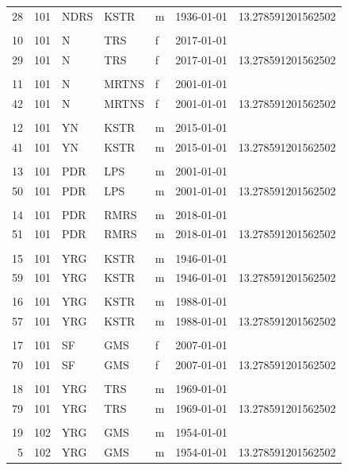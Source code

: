 \documentclass[
  12pt,
]{book}
\begin{document}
\begin{table}[t]
\begin{tabular*}{1\linewidth}{@{\extracolsep{\fill}}rrlllrr}
28 & 101 & NDRS & KSTR & m & 1936-01-01 & 13.278591201562502 \\ 
 &  &  &  &  &  &  \\ 
10 & 101 & N & TRS & f & 2017-01-01 &  \\ 
29 & 101 & N & TRS & f & 2017-01-01 & 13.278591201562502 \\ 
 &  &  &  &  &  &  \\ 
11 & 101 & N & MRTNS & f & 2001-01-01 &  \\ 
42 & 101 & N & MRTNS & f & 2001-01-01 & 13.278591201562502 \\ 
 &  &  &  &  &  &  \\ 
12 & 101 & YN & KSTR & m & 2015-01-01 &  \\ 
41 & 101 & YN & KSTR & m & 2015-01-01 & 13.278591201562502 \\ 
 &  &  &  &  &  &  \\ 
13 & 101 & PDR & LPS & m & 2001-01-01 &  \\ 
50 & 101 & PDR & LPS & m & 2001-01-01 & 13.278591201562502 \\ 
 &  &  &  &  &  &  \\ 
14 & 101 & PDR & RMRS & m & 2018-01-01 &  \\ 
51 & 101 & PDR & RMRS & m & 2018-01-01 & 13.278591201562502 \\ 
 &  &  &  &  &  &  \\ 
15 & 101 & YRG & KSTR & m & 1946-01-01 &  \\ 
59 & 101 & YRG & KSTR & m & 1946-01-01 & 13.278591201562502 \\ 
 &  &  &  &  &  &  \\ 
16 & 101 & YRG & KSTR & m & 1988-01-01 &  \\ 
57 & 101 & YRG & KSTR & m & 1988-01-01 & 13.278591201562502 \\ 
 &  &  &  &  &  &  \\ 
17 & 101 & SF & GMS & f & 2007-01-01 &  \\ 
70 & 101 & SF & GMS & f & 2007-01-01 & 13.278591201562502 \\ 
 &  &  &  &  &  &  \\ 
18 & 101 & YRG & TRS & m & 1969-01-01 &  \\ 
79 & 101 & YRG & TRS & m & 1969-01-01 & 13.278591201562502 \\ 
 &  &  &  &  &  &  \\ 
19 & 102 & YRG & GMS & m & 1954-01-01 &  \\ 
 5 & 102 & YRG & GMS & m & 1954-01-01 & 13.278591201562502 \\ 

\end{tabular*}
\end{table}
\end{document}
